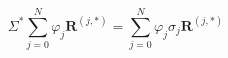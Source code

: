     \begin{equation}
        \Sigma^*\sum_{j=0}^N \varphi_j\mathbf{R}^{(j,\ast)} = \sum_{j=0}^N \varphi_j\sigma_j\mathbf{R}^{(j, \ast)}
    \label{eq:emt_solving_a}
    \end{equation}
